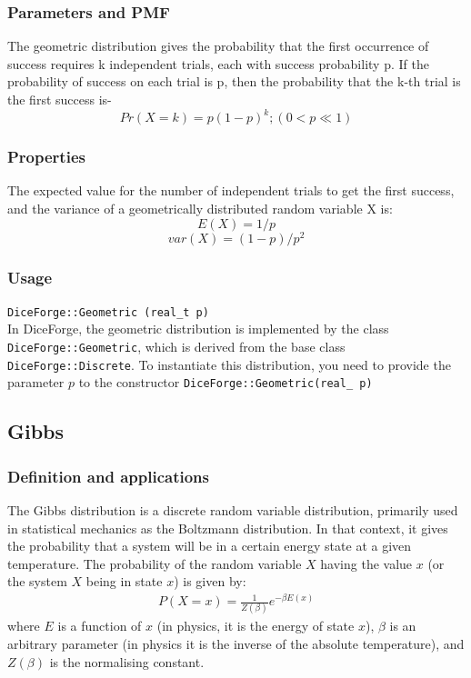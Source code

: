 \documentclass[titlepage, 11pt]{article}
\newcommand{\code}[1]
{\colorbox{light-gray}{\texttt{#1}}}
\begin{document}
\subsubsection{Parameters and PMF}
The geometric distribution gives the probability that the first occurrence of success requires k independent trials, each with success probability p. If the probability of success on each trial is p, then the probability that the k-th trial is the first success is-
$$Pr(X=k) = p(1-p)^k; (0<p\ll1)$$

\subsubsection{Properties}
The expected value for the number of independent trials to get the first success, and the variance of a geometrically distributed random variable X is:
$$E(X)=1/p$$
$$var(X)=(1-p)/p^2$$

\subsubsection{Usage}
\code{DiceForge::Geometric (real\_t p)}\\
In DiceForge, the geometric distribution is implemented by the class \code{DiceForge::Geometric}, which is derived from the base class \code{DiceForge::Discrete}. To instantiate this distribution, you need to provide the parameter $p$ to the constructor \code{DiceForge::Geometric(real\_ p)}\newline

\subsection{Gibbs}
\subsubsection{Definition and applications}
The Gibbs distribution is a discrete random variable distribution, primarily used in statistical mechanics as the Boltzmann distribution. In that context, it gives the probability that a system will be in a certain energy state at a given temperature. The probability of the random variable \(X\) having the value \(x\) (or the system \(X\) being in state \(x\)) is given by:
\begin{align}
    P(X = x) = \frac{1}{Z(\beta)} e^{-\beta E(x)}
\end{align}
where \(E\) is a function of $x$ (in physics, it is the energy of state $x$), \(\beta\) is an arbitrary parameter (in physics it is the inverse of the absolute temperature), and \(Z(\beta)\) is the normalising constant.
\end{document}
